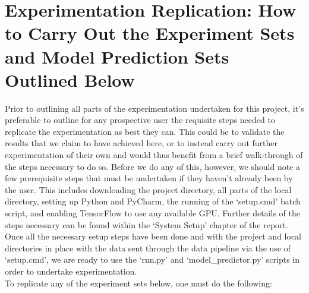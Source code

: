 \documentclass[12pt,twoside]{report}
\begin{document}
\section{Experimentation Replication: How to Carry Out the Experiment Sets and Model Prediction Sets Outlined Below}

\quad Prior to outlining all parts of the experimentation undertaken for this project, it’s preferable to outline for any prospective user the requisite steps needed to replicate the experimentation as best they can. This could be to validate the results that we claim to have achieved here, or to instead carry out further experimentation of their own and would thus benefit from a brief walk-through of the steps necessary to do so. Before we do any of this, however, we should note a few prerequisite steps that must be undertaken if they haven’t already been by the user. This includes downloading the project directory, all parts of the local directory, setting up Python and PyCharm, the running of the ‘setup.cmd’ batch script, and enabling TensorFlow to use any available GPU. Further details of the steps necessary can be found within the ‘System Setup’ chapter of the report.\\

\quad Once all the necessary setup steps have been done and with the project and local directories in place with the data sent through the data pipeline via the use of ‘setup.cmd’, we are ready to use the ‘rnn.py’ and ‘model\_predictor.py’ scripts in order to undertake experimentation.\\

\quad To replicate any of the experiment sets below, one must do the following:
\end{document}
